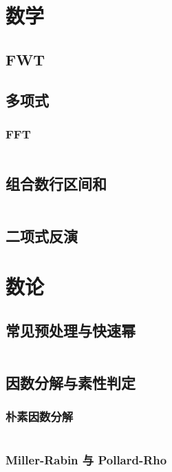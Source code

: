 \documentclass[a4paper, twoside]{article}
\begin{document}
	\begin{multicols}{2}

		\section{数学}
			\subsection{FWT}
				

			\subsection{多项式}
				\subsubsection{FFT}
					\inputminted{cpp}{../src/math/FFT.cpp}

			\subsection{组合数行区间和}
				\inputminted{cpp}{../src-midori/math/杨辉三角行区间和.cpp}
			
			\subsection{二项式反演}
				

		\newpage
		\section{数论}

			\subsection{常见预处理与快速幂}
				\inputminted{cpp}{../src-midori/number/常见预处理与快速幂.cpp}

			\subsection{因数分解与素性判定}
				\subsubsection{朴素因数分解}
					\inputminted{cpp}{../src-midori/number/素因数分解.cpp}
				\subsubsection{Miller-Rabin 与 Pollard-Rho}
					\inputminted{cpp}{../src-midori/number/miller_rabin-pollard_rho.cpp}


\end{multicols}
\end{document}
